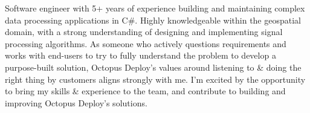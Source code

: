 \begin{justify}
Software engineer with 5+ years of experience building and maintaining complex data processing applications in C\#. Highly knowledgeable within the geospatial domain, with a strong understanding of designing and implementing signal processing algorithms. As someone who actively questions requirements and works with end-users to try to fully understand the problem to develop a purpose-built solution, Octopus Deploy's values around listening to \& doing the right thing by customers aligns strongly with me. I'm excited by the opportunity to bring my skills \& experience to the team, and contribute to building and improving Octopus Deploy's solutions.
\end{justify}